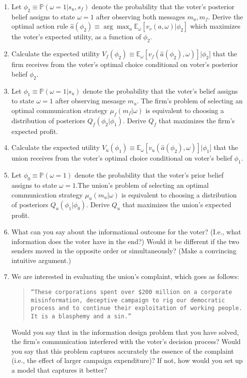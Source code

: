 \documentclass[a4paper]{article}
\begin{document}
\begin{enumerate}
	\item Let $\phi_2 \equiv \mathbb{P}(\omega=1 | s_u,s_f)$ denote the probability that the voter's posterior belief assigns to state $\omega=1$ after observing both messages $m_u,m_f$. Derive the optimal action rule $\hat{a}(\phi_2) \equiv \arg \max_a \mathbb{E}_\omega[v_v(a,\omega)|\phi_2]$ which maximizes the voter's expected utility, as a function of $\phi_2$.
	
	\item Calculate the expected utility $V_f(\phi_2) \equiv \mathbb{E}_\omega [v_f(\hat{a}(\phi_2),\omega)] | \phi_2]$ that the firm receives from the voter's optimal choice conditional on voter's posterior belief $\phi_2$.
	
	\item Let $\phi_1 \equiv \mathbb{P}(\omega=1 | s_u)$ denote the probability that the voter's belief assigns to state $\omega=1$ after observing mesasge $m_u$. The firm's problem of selecting an optimal communication strategy $\mu_f(m_f|\omega)$ is equivalent to choosing a distribution of posteriors $Q_f(\phi_2|\phi_1)$. Derive $Q_f$ that maximizes the firm's expected profit.
	
	\item Calculate the expected utility $V_u(\phi_1) \equiv \mathbb{E}_\omega [v_u(\hat{a}(\phi_2),\omega)] | \phi_1]$ that the union receives from the voter's optimal choice conditional on voter's belief $\phi_1$.
	
	\item Let $\phi_0 \equiv \mathbb{P}(\omega=1)$ denote the probability that the voter's prior belief assigns to state $\omega=1$.The union's problem of selecting an optimal communication strategy $\mu_u(m_u|\omega)$ is equivalent to choosing a distribution of posteriors $Q_u(\phi_1|\phi_0)$. Derive $Q_u$ that maximizes the union's expected profit.
	
	\item What can you say about the informational outcome for the voter? (I.e., what information does the voter have in the end?) Would it be different if the two senders moved in the opposite order or simultaneously? (Make a convincing intuitive argument.)
	
	\item We are interested in evaluating the union's complaint, which goes as follows:
	\begin{quote}
		\texttt{``These corporations spent over \$200 million on a corporate misinformation, deceptive campaign to rig our democratic process and to continue their exploitation of working people. It is a blasphemy and a sin.''}
	\end{quote}
	Would you say that in the information design problem that you have solved, the firm's communication interfered with the voter's decision process? Would you say that this problem captures accurately the essence of the complaint (i.e., the effect of larger campaign expenditure)? If not, how would you set up a model that captures it better?
\end{enumerate}
\end{document}
